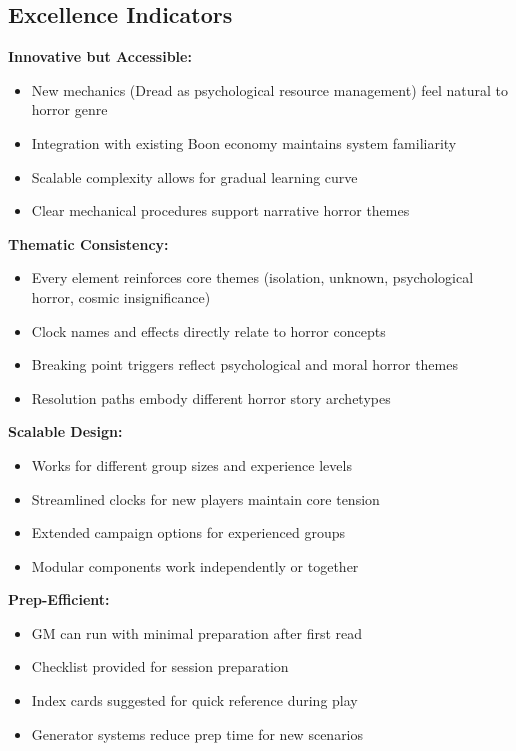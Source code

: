 \documentclass[11pt]{article}
\begin{document}
\subsection{Excellence Indicators}

\textbf{Innovative but Accessible:}
\begin{itemize}
\item New mechanics (Dread as psychological resource management) feel natural to horror genre
\item Integration with existing Boon economy maintains system familiarity
\item Scalable complexity allows for gradual learning curve
\item Clear mechanical procedures support narrative horror themes
\end{itemize}

\textbf{Thematic Consistency:}
\begin{itemize}
\item Every element reinforces core themes (isolation, unknown, psychological horror, cosmic insignificance)
\item Clock names and effects directly relate to horror concepts
\item Breaking point triggers reflect psychological and moral horror themes
\item Resolution paths embody different horror story archetypes
\end{itemize}

\textbf{Scalable Design:}
\begin{itemize}
\item Works for different group sizes and experience levels
\item Streamlined clocks for new players maintain core tension
\item Extended campaign options for experienced groups
\item Modular components work independently or together
\end{itemize}

\textbf{Prep-Efficient:}
\begin{itemize}
\item GM can run with minimal preparation after first read
\item Checklist provided for session preparation
\item Index cards suggested for quick reference during play
\item Generator systems reduce prep time for new scenarios
\end{itemize}
\end{document}
